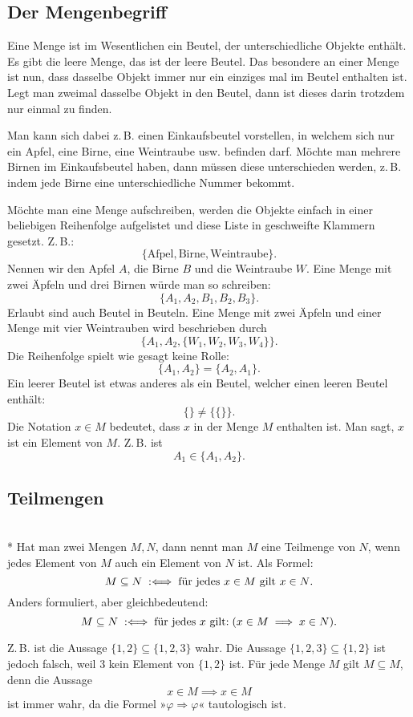\subsection{Der Mengenbegriff}

Eine Menge ist im Wesentlichen ein Beutel, der unterschiedliche
Objekte enthält. Es gibt die leere Menge, das ist der leere Beutel.
Das besondere an einer Menge ist nun, dass dasselbe Objekt immer
nur ein einziges mal im Beutel enthalten ist. Legt man zweimal
dasselbe Objekt in den Beutel, dann ist dieses darin trotzdem nur
einmal zu finden.

Man kann sich dabei z.\,B. einen Einkaufsbeutel vorstellen,
in welchem sich nur ein Apfel, eine Birne, eine Weintraube usw.
befinden darf. Möchte man mehrere Birnen im Einkaufsbeutel haben,
dann müssen diese unterschieden werden, z.\,B. indem jede Birne
eine unterschiedliche Nummer bekommt.

Möchte man eine Menge aufschreiben, werden die Objekte einfach
in einer beliebigen Reihenfolge aufgelistet und diese Liste in
geschweifte Klammern gesetzt. Z.\,B.:%
\[\{\mathrm{Afpel}, \mathrm{Birne}, \mathrm{Weintraube}\}.\]
Nennen wir den Apfel $A$, die Birne $B$
und die Weintraube $W$. Eine Menge mit zwei Äpfeln und drei
Birnen würde man so schreiben:%
\[\{A_1, A_2, B_1, B_2, B_3\}.\]
Erlaubt sind auch Beutel in Beuteln. Eine Menge mit zwei Äpfeln
und einer Menge mit vier Weintrauben wird beschrieben durch%
\[\{A_1, A_2, \{W_1,W_2,W_3,W_4\}\}.\]
Die Reihenfolge spielt wie gesagt keine Rolle:%
\[\{A_1,A_2\} = \{A_2,A_1\}.\]
Ein leerer Beutel ist etwas anderes als ein Beutel, welcher einen
leeren Beutel enthält:%
\[\{\} \ne \{\{\}\}.\]
Die Notation $x\in M$ bedeutet, dass $x$ in der Menge $M$ enthalten
ist. Man sagt, $x$ ist ein Element von $M$. Z.\,B. ist
\[A_1\in\{A_1,A_2\}.\]

\newpage
\subsection{Teilmengen}

\begin{Definition}[Teilmengenrelation]\mbox{}\\*
Hat man zwei Mengen $M,N$, dann nennt man $M$ eine Teilmenge von $N$,
wenn jedes Element von $M$ auch ein Element von $N$ ist.
Als Formel:
\[M\subseteq N\;:\Longleftrightarrow\; \text{für jedes $x\in M$ gilt $x\in N$}.\]
Anders formuliert, aber gleichbedeutend:
\[M\subseteq N\;:\Longleftrightarrow\; \text{für jedes $x$ gilt:}\; (x\in M\implies x\in N).\]
\end{Definition}
Z.\,B. ist die Aussage $\{1,2\}\subseteq\{1,2,3\}$ wahr.
Die Aussage $\{1,2,3\}\subseteq\{1,2\}$ ist jedoch falsch,
weil $3$ kein Element von $\{1,2\}$ ist. Für jede Menge $M$ gilt
$M\subseteq M$, denn die Aussage
\[x\in M\implies x\in M\]
ist immer wahr, da die Formel »$\varphi\Rightarrow\varphi$«
tautologisch ist.

